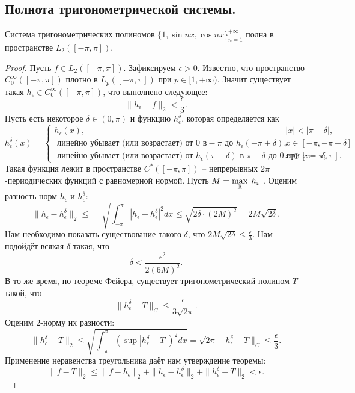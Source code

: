 \subsection{Полнота тригонометрической системы.}
\begin{theorem}
    Система тригонометрических полиномов $\{1, \sin nx, \cos nx\}_{n = 1}^{+\infty}$ полна в пространстве $L_2([-\pi, \pi])$.
\end{theorem}
\begin{proof}
    Пусть $f \in L_2([-\pi, \pi])$.
    Зафиксируем $\epsilon > 0$.
    Известно, что пространство $C_0^\infty([-\pi, \pi])$ плотно в $L_p([-\pi, \pi])$ при $p \in [1, +\infty)$.
    Значит существует такая $h_\epsilon \in C_0^\infty([-\pi, \pi])$, что выполнено следующее:
    \[
        \|h_\epsilon - f\|_2 < \frac{\epsilon}{3}.
    \]
    Пусть есть некоторое $\delta \in (0, \pi)$ и функцию $h_\epsilon^\delta$, которая определяется как
    \[
        h_{\epsilon}^{\delta}(x) =
        \begin{cases}
            h_{\epsilon}(x), & |x| < |\pi - \delta|, \\
            \text{ линейно убывает (или возрастает) от 0 в} -\pi \text{ до } h_\epsilon(-\pi + \delta), & x \in [-\pi, -\pi + \delta] \\
            \text{ линейно убывает (или возрастает) от } h_\epsilon(\pi - \delta) \text{ в } \pi - \delta \text{ до } 0 \text{ при } x = \pi, & x \in [\pi - \delta, \pi].
        \end{cases}
    \]
    Такая функция лежит в пространстве $C^*([-\pi, \pi])$ -- непрерывных $2\pi$-периодических функций с равномерной нормой.
    Пусть $M = \max\limits_{\mathbb{R}} |h_{\varepsilon}|$.
    Оценим разность норм $h_\epsilon$ и $h_\epsilon^\delta$:
    \[
        \|h_\epsilon - h_\epsilon^\delta\|_2 \leq = \sqrt {\int_{-\pi}^{\pi} |h_\epsilon - h_\epsilon^\delta|^2 dx} \leq \sqrt{2 \delta \cdot (2M)^2} = 2M\sqrt {2\delta}.
    \]
    Нам необходимо показать существование такого $\delta$, что $2M \sqrt {2\delta} \leq \frac{\epsilon}{3}$.
    Нам подойдёт всякая $\delta$ такая, что
    \[
        \delta < \frac{\epsilon^2}{2(6M)^2}.
    \]
    В то же время, по теореме Фейера, существует тригонометрический полином $T$ такой, что \[\|h_\epsilon^\delta - T\|_C \leq \frac{\epsilon}{3\sqrt {2\pi}}.\]
    Оценим $2$-норму их разности:
    \[
        \|h_\epsilon^\delta - T\|_2 \leq \sqrt {\int_{-\pi}^{\pi} (\sup|h_\epsilon^\delta - T|)^2dx} = \sqrt {2\pi}\|h_\epsilon^\delta - T\|_C \leq \dfrac{\epsilon}{3}.
    \]
    Применение неравенства треугольника даёт нам утверждение теоремы:
    \[
        \|f - T\|_2 \leq \|f - h_\epsilon\|_2 + \|h_\epsilon - h_\epsilon^\delta\|_2 + \|h_\epsilon^\delta - T\|_2 < \epsilon.
    \]
\end{proof}
